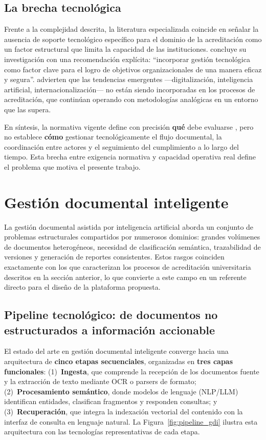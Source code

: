 \subsection{La brecha tecnológica}

Frente a la complejidad descrita, la literatura especializada coincide en señalar la ausencia de soporte tecnológico específico para el dominio de la acreditación como un factor estructural que limita la capacidad de las instituciones. \citet{sanabria2023procesos} concluye su investigación con una recomendación explícita: ``incorporar gestión tecnológica como factor clave para el logro de objetivos organizacionales de una manera eficaz y segura''. \citet{casadiego2025acreditacion} advierten que las tendencias emergentes ---digitalización, inteligencia artificial, internacionalización--- no están siendo incorporadas en los procesos de acreditación, que continúan operando con metodologías analógicas en un entorno que las supera.

En síntesis, la normativa vigente define con precisión \textbf{qué} debe evaluarse \citep{ordenanza62, ordenanza75}, pero no establece \textbf{cómo} gestionar tecnológicamente el flujo documental, la coordinación entre actores y el seguimiento del cumplimiento a lo largo del tiempo. Esta brecha entre exigencia normativa y capacidad operativa real define el problema que motiva el presente trabajo.

\section{Gestión documental inteligente}
\label{sec:eda_gestion_documental}

La gestión documental asistida por inteligencia artificial aborda un conjunto de problemas estructurales compartidos por numerosos dominios: grandes volúmenes de documentos heterogéneos, necesidad de clasificación semántica, trazabilidad de versiones y generación de reportes consistentes. Estos rasgos coinciden exactamente con los que caracterizan los procesos de acreditación universitaria descritos en la sección anterior, lo que convierte a este campo en un referente directo para el diseño de la plataforma propuesta.

\subsection{Pipeline tecnológico: de documentos no estructurados a información accionable}

El estado del arte en gestión documental inteligente converge hacia una arquitectura de \textbf{cinco etapas secuenciales}, organizadas en \textbf{tres capas funcionales}: (1)~\textbf{Ingesta}, que comprende la recepción de los documentos fuente y la extracción de texto mediante OCR o parsers de formato; (2)~\textbf{Procesamiento semántico}, donde modelos de lenguaje (NLP/LLM) identifican entidades, clasifican fragmentos y responden consultas; y (3)~\textbf{Recuperación}, que integra la indexación vectorial del contenido con la interfaz de consulta en lenguaje natural. La Figura~\ref{fig:pipeline_gdi} ilustra esta arquitectura con las tecnologías representativas de cada etapa.

